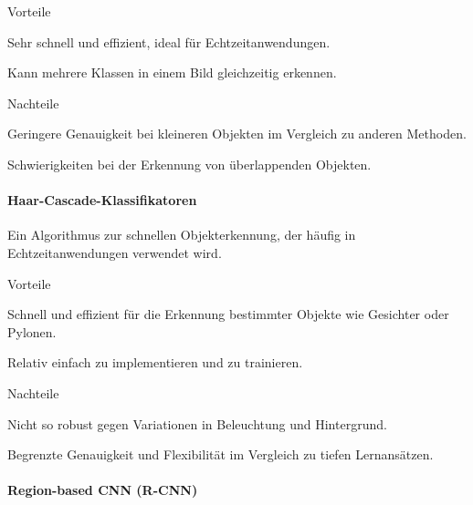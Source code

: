 \begin{minipage}[t]{0.48\textwidth}
\begin{items}
  \item [Vorteile]
  \item Sehr schnell und effizient, ideal für Echtzeitanwendungen.
  \item Kann mehrere Klassen in einem Bild gleichzeitig erkennen.
\end{items}
\end{minipage}
\hfill
\begin{minipage}[t]{0.48\textwidth}
\begin{items}
  \item [Nachteile]
  \item Geringere Genauigkeit bei kleineren Objekten im Vergleich zu anderen Methoden.
  \item Schwierigkeiten bei der Erkennung von überlappenden Objekten.
\end{items}
\end{minipage}

\paragraph{Haar-Cascade-Klassifikatoren}

Ein Algorithmus zur schnellen Objekterkennung, der häufig in Echtzeitanwendungen verwendet wird.

\begin{minipage}[t]{0.48\textwidth}
\begin{items}
  \item [Vorteile]
  \item Schnell und effizient für die Erkennung bestimmter Objekte wie Gesichter oder Pylonen.
  \item Relativ einfach zu implementieren und zu trainieren.
\end{items}
\end{minipage}
\hfill
\begin{minipage}[t]{0.48\textwidth}
\begin{items}
  \item [Nachteile]
  \item Nicht so robust gegen Variationen in Beleuchtung und Hintergrund.
  \item Begrenzte Genauigkeit und Flexibilität im Vergleich zu tiefen Lernansätzen.
\end{items}
\end{minipage}

\paragraph{Region-based CNN (R-CNN)}

